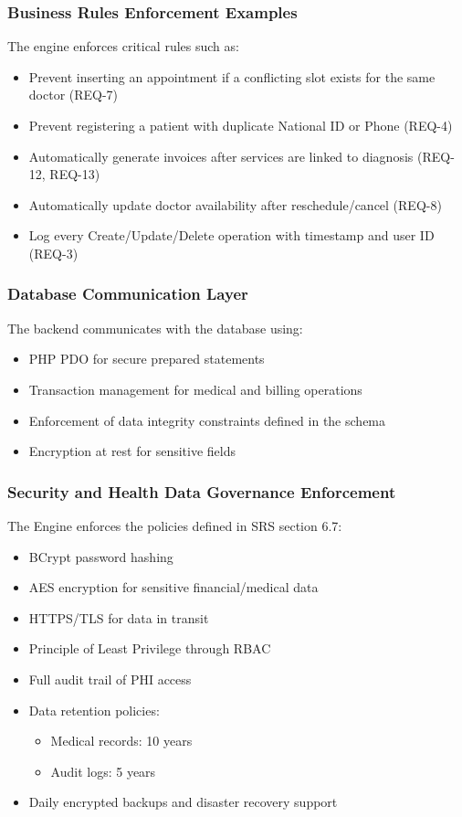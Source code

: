 \subsubsection{Business Rules Enforcement Examples}
The engine enforces critical rules such as:
\begin{itemize}
	\item Prevent inserting an appointment if a conflicting slot exists for the same doctor (REQ-7)
	\item Prevent registering a patient with duplicate National ID or Phone (REQ-4)
	\item Automatically generate invoices after services are linked to diagnosis (REQ-12, REQ-13)
	\item Automatically update doctor availability after reschedule/cancel (REQ-8)
	\item Log every Create/Update/Delete operation with timestamp and user ID (REQ-3)
\end{itemize}

\subsubsection{Database Communication Layer}
The backend communicates with the database using:
\begin{itemize}
	\item PHP PDO for secure prepared statements
	\item Transaction management for medical and billing operations
	\item Enforcement of data integrity constraints defined in the schema
	\item Encryption at rest for sensitive fields
\end{itemize}

\subsubsection{Security and Health Data Governance Enforcement}
The Engine enforces the policies defined in SRS section 6.7:
\begin{itemize}
	\item BCrypt password hashing
	\item AES encryption for sensitive financial/medical data
	\item HTTPS/TLS for data in transit
	\item Principle of Least Privilege through RBAC
	\item Full audit trail of PHI access
	\item Data retention policies:
	\begin{itemize}
		\item Medical records: 10 years
		\item Audit logs: 5 years
	\end{itemize}
	\item Daily encrypted backups and disaster recovery support
\end{itemize}

